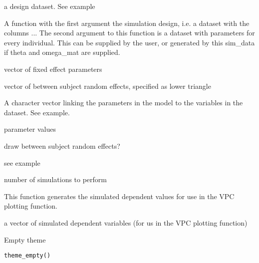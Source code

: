 \documentclass[letterpaper]{book}
\begin{document}
\begin{Arguments}
\begin{ldescription}
\item[\code{design}] a design dataset. See example

\item[\code{model}] A function with the first argument the simulation design, i.e. a dataset with the columns ... The second argument to this function is a dataset with parameters for every individual. This can be supplied by the user, or generated by this sim\_data if theta and omega\_mat are supplied.

\item[\code{theta}] vector of fixed effect parameters

\item[\code{omega\_mat}] vector of between subject random effects, specified as lower triangle

\item[\code{par\_names}] A character vector linking the parameters in the model to the variables in the dataset. See example.

\item[\code{par\_values}] parameter values

\item[\code{draw\_iiv}] draw between subject random effects?

\item[\code{error}] see example

\item[\code{n}] number of simulations to perform
\end{ldescription}
\end{Arguments}
%
\begin{Details}\relax
This function generates the simulated dependent values for use in the VPC plotting function.
\end{Details}
%
\begin{Value}
a vector of simulated dependent variables (for us in the VPC plotting function)
\end{Value}
%
\begin{SeeAlso}\relax
{}
\end{SeeAlso}
%
\begin{Description}\relax
Empty theme
\end{Description}
%
\begin{Usage}
\begin{verbatim}
theme_empty()
\end{verbatim}
\end{Usage}
\end{document}
